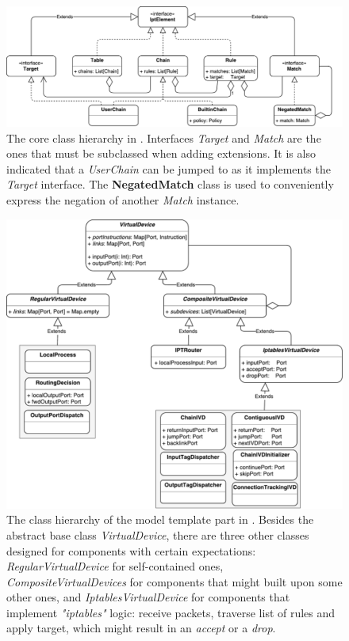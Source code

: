 \begin{figure}[h]
  \centering

  \includegraphics[scale=0.5]{src/img/ipt-hierarchy}
  \caption[The core class hierarchy in \TOOL.]{The core class hierarchy in
  \TOOL.  Interfaces \emph{Target} and \emph{Match} are the ones that must be
  subclassed when adding extensions.  It is also indicated that a
  \emph{UserChain} can be jumped to as it implements the \emph{Target}
  interface.  The \textbf{NegatedMatch} class is used to conveniently express
  the negation of another \emph{Match} instance.}
  \label{fig:ipt-hierarchy}
\end{figure}

\begin{figure}[h]
  \centering

  \includegraphics[scale=0.55]{src/img/virtdev-hierarchy}
  \caption[The class hierarchy that defines the model template part in
  \TOOL.]{The class hierarchy of the model template part in \TOOL. Besides the
  abstract base class \emph{VirtualDevice}, there are three other classes
  designed for components with certain expectations:
  \emph{RegularVirtualDevice} for self-contained ones,
  \emph{CompositeVirtualDevices} for components that might built upon some
  other ones, and \emph{IptablesVirtualDevice} for components that implement
  \emph{"iptables"} logic: receive packets, traverse list of rules and apply
  target, which might result in an \emph{accept} or a \emph{drop}.}
  \label{fig:virtdev-hierarchy}
\end{figure}

